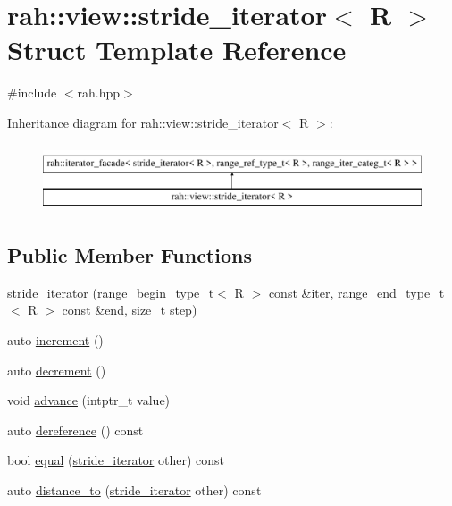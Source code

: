 \hypertarget{structrah_1_1view_1_1stride__iterator}{}\section{rah\+::view\+::stride\+\_\+iterator$<$ R $>$ Struct Template Reference}
\label{structrah_1_1view_1_1stride__iterator}


{\ttfamily \#include $<$rah.\+hpp$>$}

Inheritance diagram for rah\+::view\+::stride\+\_\+iterator$<$ R $>$\+:\begin{figure}[H]
\begin{center}
\leavevmode
\includegraphics[height=2.000000cm]{structrah_1_1view_1_1stride__iterator}
\end{center}
\end{figure}
\subsection*{Public Member Functions}
\begin{DoxyCompactItemize}
\item 
\mbox{\hyperlink{structrah_1_1view_1_1stride__iterator_a47ddd2ce0f295fa825919f04431d64a9}{stride\+\_\+iterator}} (\mbox{\hyperlink{namespacerah_a28aff4eeddcece6be65ff0b956d32d4a}{range\+\_\+begin\+\_\+type\+\_\+t}}$<$ R $>$ const \&iter, \mbox{\hyperlink{namespacerah_a9657e24ae477f4482225b133fe286b65}{range\+\_\+end\+\_\+type\+\_\+t}}$<$ R $>$ const \&\mbox{\hyperlink{namespacerah_aaddd1442cd76b96876e692cdefe7261d}{end}}, size\+\_\+t step)
\item 
auto \mbox{\hyperlink{structrah_1_1view_1_1stride__iterator_ae98465362884b064db4184a406221154}{increment}} ()
\item 
auto \mbox{\hyperlink{structrah_1_1view_1_1stride__iterator_a8104aed5699a5f26626c8a010a97f5f4}{decrement}} ()
\item 
void \mbox{\hyperlink{structrah_1_1view_1_1stride__iterator_aede4ba99f4ede1afdad678bd0dba4f7b}{advance}} (intptr\+\_\+t value)
\item 
auto \mbox{\hyperlink{structrah_1_1view_1_1stride__iterator_af8bc6022711a953e2b8dce5b7e7553dd}{dereference}} () const
\item 
bool \mbox{\hyperlink{structrah_1_1view_1_1stride__iterator_a34c24e935ee7beebcd7269ee314e245a}{equal}} (\mbox{\hyperlink{structrah_1_1view_1_1stride__iterator}{stride\+\_\+iterator}} other) const
\item 
auto \mbox{\hyperlink{structrah_1_1view_1_1stride__iterator_ad30be3983aec3fab52efb32a1a461056}{distance\+\_\+to}} (\mbox{\hyperlink{structrah_1_1view_1_1stride__iterator}{stride\+\_\+iterator}} other) const
\end{DoxyCompactItemize}
